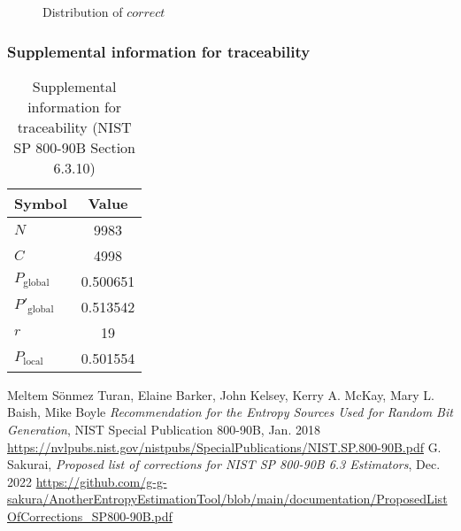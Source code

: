 \documentclass[a3paper,xelatex,english]{bxjsarticle}
\begin{document}
\begin{figure}[htbp]
\centering

\caption{Distribution of $correct$}
\end{figure}
\subsubsection{Supplemental information for traceability}
\renewcommand{\arraystretch}{1.8}
\begin{table}[h]
\caption{Supplemental information for traceability (NIST SP 800-90B Section 6.3.10)}
\begin{center}
\begin{tabular}{|l|c|}
\hline 
\rowcolor{anotherlightblue} %
Symbol				& Value \\ \hline 
$N$				& 9983\\ \hline 
$C$				& 4998\\ \hline 
$P_{\textrm{global}}$				& 0.500651\\ \hline 
$P'_{\textrm{global}}$			& 0.513542\\ \hline 
$r$				& 19\\ \hline 
$P_{\textrm{local}}$ 			& 0.501554\\ \hline
\end{tabular}
\end{center}
\end{table}
\renewcommand{\arraystretch}{1.4}
\begin{thebibliography}{99}
Meltem S\"{o}nmez Turan,
Elaine Barker,
John Kelsey,
Kerry A. McKay,
Mary L. Baish,
Mike Boyle
\textit{Recommendation for the Entropy Sources Used for Random Bit Generation},
NIST Special Publication 800-90B, Jan. 2018 
\url{https://nvlpubs.nist.gov/nistpubs/SpecialPublications/NIST.SP.800-90B.pdf}
G. Sakurai, \textit{Proposed list of corrections for NIST SP 800-90B 6.3 Estimators}, Dec. 2022 
\url{https://github.com/g-g-sakura/AnotherEntropyEstimationTool/blob/main/documentation/ProposedListOfCorrections_SP800-90B.pdf}
\end{thebibliography}
\end{document}
